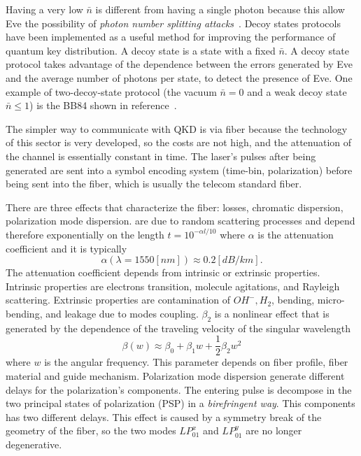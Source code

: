 Having a very low $\bar{n}$ is different from having a single photon because this allow Eve the possibility of \textit{photon number splitting attacks}~\cite{a24}.
Decoy states protocols have been implemented as a useful method for improving the performance of quantum key distribution. A decoy state is a state with a fixed $\bar{n}$. A decoy state protocol takes advantage of the dependence between the errors generated by Eve and the average number of photons per state, to detect the presence of Eve.
One example of two-decoy-state protocol (the vacuum $\bar{n} = 0$ and a weak decoy state $\bar{n} \le 1$) is the BB84 shown in reference~\cite{b24}.


The simpler way to communicate with QKD is via fiber because the technology of this sector is very developed, so the costs are not high, and the attenuation of the channel is essentially constant in time. The laser's pulses after being generated are sent into a symbol encoding system (time-bin, polarization) before being sent into the fiber, which is usually the telecom standard fiber.

There are three effects that characterize the fiber: losses, chromatic dispersion, polarization mode dispersion.  are due to random scattering processes and depend therefore exponentially on the length $t = 10^{-\alpha l / 10}$ where $\alpha$ is the attenuation coefficient and it is typically
\begin{equation}
  \alpha(\lambda = 1550[nm]) \approx 0.2 [dB / km].
\end{equation}
The attenuation coefficient depends from intrinsic or extrinsic properties. Intrinsic properties are electrons transition, molecule agitations, and Rayleigh scattering. Extrinsic properties are contamination of $OH^-, H_2$, bending, micro-bending, and leakage due to modes coupling.  $\beta_2$ is a nonlinear effect that is generated by the dependence of the traveling velocity of the singular wavelength
\begin{equation}
  \beta(w) \approx \beta_0 + \beta_1 w + \frac{1}{2} \beta_2 w^2
\end{equation}
where $w$ is the angular frequency. This parameter depends on fiber profile, fiber material and guide mechanism. Polarization mode dispersion  generate different delays for the polarization's components. The entering pulse is decompose in the two principal states of polarization (PSP) in a \textit{birefringent way}. This components has two different delays. This effect is caused by a symmetry break of the geometry of the fiber, so the two modes $LP_{01}^x$ and $LP_{01}^y$ are no longer degenerative.

